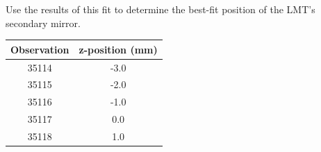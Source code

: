 Use the results of this
fit to determine the best-fit position of the LMT's secondary mirror.

\begin{table}[h]
    \centering
    \begin{tabular}{|c|c|}
        \toprule
         Observation  & z-position (mm)  \\
         \midrule
         35114 & -3.0\\
         35115 & -2.0 \\
         35116 & -1.0 \\
         35117 & 0.0 \\
         35118 & 1.0\\
         \bottomrule
    \end{tabular}
\end{table}

